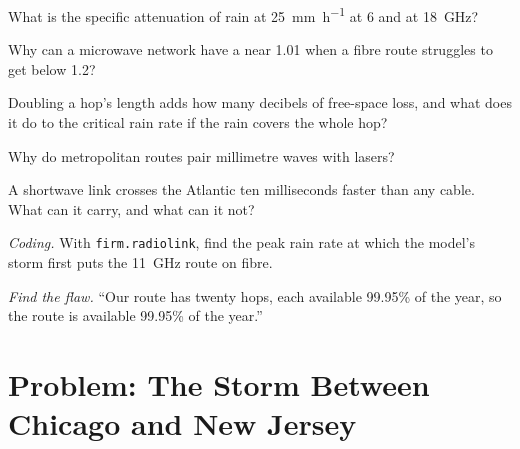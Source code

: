 \begin{exercise}[$\star$]\label{exo:nw:long-haul-wireless:2}
What is the specific attenuation of rain at \qty{25}{\milli\metre\per\hour} at 6 and at \qty{18}{\giga\hertz}?
\end{exercise}

\begin{exercise}[$\star$]\label{exo:nw:long-haul-wireless:3}
Why can a microwave network have a  near 1.01 when a fibre route struggles to get below 1.2?
\end{exercise}

\begin{exercise}[$\star\star$]\label{exo:nw:long-haul-wireless:4}
Doubling a hop's length adds how many decibels of free-space loss, and what does it do to the critical rain rate if the rain covers the whole hop?
\end{exercise}

\begin{exercise}[$\star\star$]\label{exo:nw:long-haul-wireless:5}
Why do metropolitan routes pair millimetre waves with lasers?
\end{exercise}

\begin{exercise}[$\star\star$]\label{exo:nw:long-haul-wireless:6}
A shortwave link crosses the Atlantic ten milliseconds faster than any cable. What can it carry, and what can it not?
\end{exercise}

\begin{exercise}[$\star\star\star$]\label{exo:nw:long-haul-wireless:7}
\emph{Coding.} With \texttt{firm.radiolink}, find the peak rain rate at which the model's storm first puts the \qty{11}{\giga\hertz} route on fibre.
\end{exercise}

\begin{exercise}[$\star\star\star$]\label{exo:nw:long-haul-wireless:8}
\emph{Find the flaw.} ``Our route has twenty hops, each available 99.95\% of the year, so the route is available 99.95\% of the year.''
\end{exercise}

\section{Problem: The Storm Between Chicago and New Jersey}

